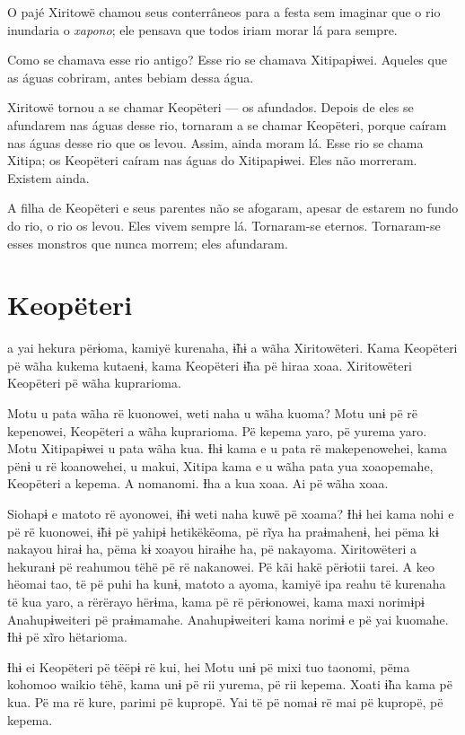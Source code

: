 O pajé Xiritowë chamou seus conterrâneos para a festa sem imaginar que o
rio inundaria o \textit{xapono}; ele pensava que todos iriam morar lá para
sempre. 

Como se chamava esse rio {antigo}? Esse rio se chamava
Xitipapɨwei. Aqueles que as águas cobriram, antes bebiam dessa água. 

Xiritowë tornou a se chamar Keopëteri --- os afundados. Depois de eles se
afundarem nas águas desse rio, tornaram a se chamar Keopëteri, porque
caíram nas águas desse rio que os levou. Assim, ainda moram lá. Esse rio
se chama Xitipa; os Keopëteri caíram nas águas do Xitipapɨwei. Eles não
morreram. Existem ainda. 

A filha de Keopëteri e seus parentes não se afogaram, apesar de estarem
no fundo do rio, o rio os levou. Eles vivem sempre lá. Tornaram-se
eternos. Tornaram-se esses monstros que nunca morrem; eles afundaram.

\chapter{Keopëteri}

 a yai hekura përɨoma, kamiyë kurenaha, ɨ̃hɨ a wãha
Xiritowëteri. Kama Keopëteri pë wãha kukema kutaenɨ, kama Keopëteri ɨ̃ha
pë hiraa xoaa. Xiritowëteri Keopëteri pë wãha kuprarioma.

Motu u pata wãha rë kuonowei, weti naha u wãha kuoma? Motu unɨ pë rë
kepenowei, Keopëteri a wãha kuprarioma. Pë kepema yaro, pë yurema yaro.
Motu Xitipapɨwei u pata wãha kua. Ɨhɨ kama e u pata rë makepenowehei,
kama pënɨ u rë koanowehei, u makui, Xitipa kama e u wãha pata yua
xoaopemahe, Keopëteri a kepema. A nomanomi. Ɨha a kua xoaa. Ai pë wãha
xoaa. 

Siohapɨ e matoto rë ayonowei, ɨ̃hɨ weti naha kuwë pë xoama? Ɨhɨ hei kama
nohi e pë rë kuonowei, ɨ̃hɨ pë yahipɨ hetikëkëoma, pë rĩya ha praɨmahenɨ,
hei pëma kɨ nakayou hiraɨ ha, pëma kɨ xoayou hiraɨhe ha, pë nakayoma.
Xiritowëteri a hekuranɨ pë reahumou tëhë pë rë nakanowei. Pë kãi hakë
përɨotii tarei. A keo hëomai tao, të pë puhi ha kunɨ, matoto a ayoma,
kamiyë ipa reahu të kurenaha të kua yaro, a rërërayo hërɨma, kama pë rë
përɨonowei, kama maxi norimɨpɨ Anahupɨweiteri pë praɨmamahe.
Anahupɨweiteri kama norimɨ e pë yai kuomahe. Ɨhɨ pë xĩro hëtarioma. 

Ɨhɨ ei Keopëteri pë tëëpɨ rë kui, hei Motu unɨ pë mixi tuo taonomi, pëma
kohomoo waikio tëhë, kama unɨ pë rii yurema, pë rii kepema. Xoati ɨ̃ha
kama pë kua. Pë ma rë kure, parimi pë kupropë. Yai të pë nomaɨ rë mai pë
kupropë, pë kepema. 

